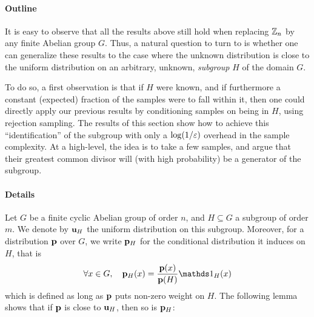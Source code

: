 \paragraph{Outline} It is easy to observe that all the results above still hold when replacing $\mathbb{Z}_n$ by any finite Abelian group $G$. Thus, a natural question to turn to is whether one can generalize these results to the case where the unknown distribution is close to the uniform distribution on an arbitrary, unknown, \emph{subgroup} $H$ of the domain $G$.

\noindent To do so, a first observation is that if $H$ were known, and if furthermore a constant (expected) fraction of the samples were to fall within it, then one could directly apply our previous results by conditioning samples on being in $H$, using rejection sampling. The results of this section show how to achieve this ``identification'' of the subgroup with only a $\log(1/\varepsilon)$ overhead in the sample complexity. At a high-level, the idea is to take a few samples, and argue that their greatest common divisor will (with high probability) be a generator of the subgroup.\medskip

\paragraph{Details} Let $G$ be a finite cyclic Abelian group of order $n$, and $H\subseteq G$ a subgroup of order $m$. We denote by $\mathbf{u}_H$ the uniform distribution on this subgroup. Moreover, for a distribution $\mathbf{p}$ over $G$, we write $\mathbf{p}_H$ for the conditional distribution it induces on $H$, that is 
\[
  \forall x\in G,\quad \D_H(x) = \frac{\D(x)}{\D(H)}\indicSet{H}(x)
\]
which is defined as long as $\mathbf{p}$ puts non-zero {weight} on $H$. The following lemma shows that if $\mathbf{p}$ is close to $\mathbf{u}_H$, then so is $\mathbf{p}_H$:

